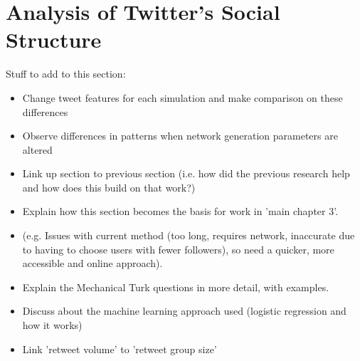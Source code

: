 \chapter{Analysis of Twitter's Social Structure}


Stuff to add to this section:
\begin{itemize}
\item Change tweet features for each simulation and make comparison on these differences
\item Observe differences in patterns when network generation parameters are altered
\item Link up section to previous section (i.e. how did the previous research help and how does this build on that work?)
\item Explain how this section becomes the basis for work in 'main chapter 3'.
\item (e.g. Issues with current method (too long, requires network, inaccurate due to having to choose users with fewer followers), so need a quicker, more accessible and online approach).
\item Explain the Mechanical Turk questions in more detail, with examples.
\item Discuss about the machine learning approach used (logistic regression and how it works)
\item Link 'retweet volume' to 'retweet group size'
\end{itemize}

